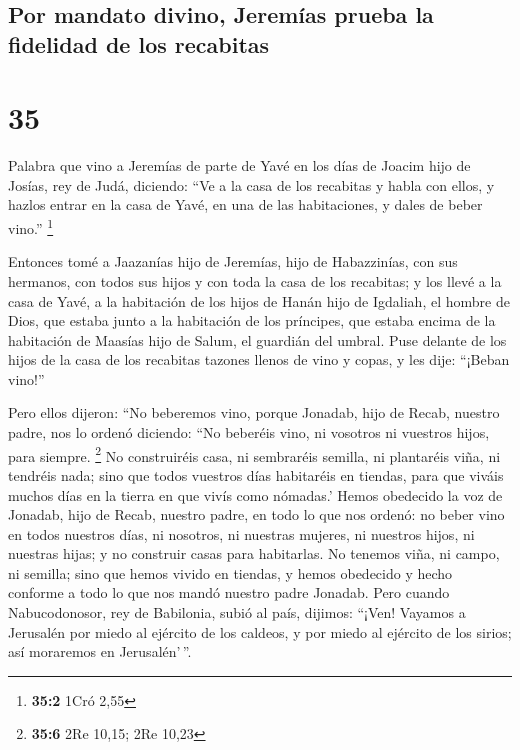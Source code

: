\begin{paracol}{2}
{\subsection{Por mandato divino, Jeremías prueba la fidelidad de los
recabitas}\label{por-mandato-divino-jeremuxedas-prueba-la-fidelidad-de-los-recabitas}}

\hypertarget{section-68}{%
\section{35}\label{section-68}}

 Palabra que vino a Jeremías de parte de Yavé en los días
de Joacim hijo de Josías, rey de Judá, diciendo:  ``Ve a
la casa de los recabitas y habla con ellos, y hazlos entrar en la casa
de Yavé, en una de las habitaciones, y dales de beber vino.''
\footnote{\textbf{35:2} 1Cró 2,55}

 Entonces tomé a Jaazanías hijo de Jeremías, hijo de
Habazzinías, con sus hermanos, con todos sus hijos y con toda la casa de
los recabitas;  y los llevé a la casa de Yavé, a la
habitación de los hijos de Hanán hijo de Igdaliah, el hombre de Dios,
que estaba junto a la habitación de los príncipes, que estaba encima de
la habitación de Maasías hijo de Salum, el guardián del umbral.
 Puse delante de los hijos de la casa de los recabitas
tazones llenos de vino y copas, y les dije: ``¡Beban vino!''

 Pero ellos dijeron: ``No beberemos vino, porque Jonadab,
hijo de Recab, nuestro padre, nos lo ordenó diciendo: ``No beberéis
vino, ni vosotros ni vuestros hijos, para siempre. \footnote{\textbf{35:6}
  2Re 10,15; 2Re 10,23}  No construiréis casa, ni
sembraréis semilla, ni plantaréis viña, ni tendréis nada; sino que todos
vuestros días habitaréis en tiendas, para que viváis muchos días en la
tierra en que vivís como nómadas.'  Hemos obedecido la voz
de Jonadab, hijo de Recab, nuestro padre, en todo lo que nos ordenó: no
beber vino en todos nuestros días, ni nosotros, ni nuestras mujeres, ni
nuestros hijos, ni nuestras hijas;  y no construir casas
para habitarlas. No tenemos viña, ni campo, ni semilla; 
sino que hemos vivido en tiendas, y hemos obedecido y hecho conforme a
todo lo que nos mandó nuestro padre Jonadab.  Pero cuando
Nabucodonosor, rey de Babilonia, subió al país, dijimos: ``¡Ven! Vayamos
a Jerusalén por miedo al ejército de los caldeos, y por miedo al
ejército de los sirios; así moraremos en Jerusalén'\,''.


\end{paracol}
